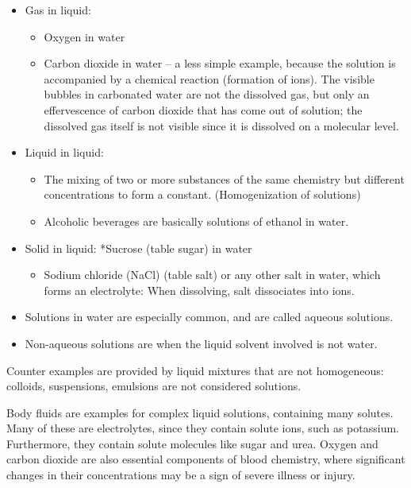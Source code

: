 \documentclass[
]{book}
\providecommand{\tightlist}{%
  \setlength{\itemsep}{0pt}\setlength{\parskip}{0pt}}
\begin{document}
\begin{itemize}
\tightlist
\item
  Gas in liquid:

  \begin{itemize}
  \tightlist
  \item
    Oxygen in water
  \item
    Carbon dioxide in water -- a less simple example, because the solution is accompanied by a chemical reaction (formation of ions). The visible bubbles in carbonated water are not the dissolved gas, but only an effervescence of carbon dioxide that has come out of solution; the dissolved gas itself is not visible since it is dissolved on a molecular level.
  \end{itemize}
\item
  Liquid in liquid:

  \begin{itemize}
  \tightlist
  \item
    The mixing of two or more substances of the same chemistry but different concentrations to form a constant. (Homogenization of solutions)
  \item
    Alcoholic beverages are basically solutions of ethanol in water.
  \end{itemize}
\item
  Solid in liquid:
  *Sucrose (table sugar) in water

  \begin{itemize}
  \tightlist
  \item
    Sodium chloride (NaCl) (table salt) or any other salt in water, which forms an electrolyte: When dissolving, salt dissociates into ions.
  \end{itemize}
\item
  Solutions in water are especially common, and are called aqueous solutions.
\item
  Non-aqueous solutions are when the liquid solvent involved is not water.
\end{itemize}

Counter examples are provided by liquid mixtures that are not homogeneous: colloids, suspensions, emulsions are not considered solutions.

Body fluids are examples for complex liquid solutions, containing many solutes. Many of these are electrolytes, since they contain solute ions, such as potassium. Furthermore, they contain solute molecules like sugar and urea. Oxygen and carbon dioxide are also essential components of blood chemistry, where significant changes in their concentrations may be a sign of severe illness or injury.
\end{document}
